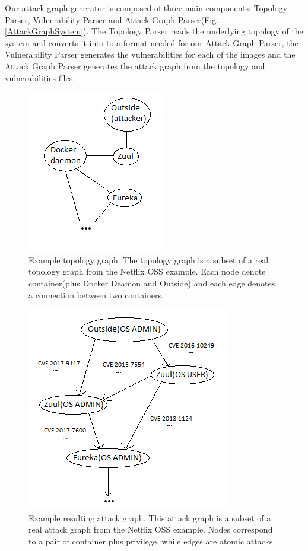 Our attack graph generator is composed of three main components: Topology Parser, Vulnerability Parser and Attack Graph Parser(Fig. \ref{AttackGraphSystem}). The Topology Parser reads the underlying topology of the system and converts it into to a format needed for our Attack Graph Parser, the Vulnerability Parser generates the vulnerabilities for each of the images and the Attack Graph Parser generates the attack graph from the topology and vulnerabilities files. 

\begin{figure}
	\includegraphics[]{./images/Topology_graph}
	\caption{Example topology graph. The topology graph is a subset of a real topology graph from the Netflix OSS example. Each node denote container(plus Docker Deamon and Outside) and each edge denotes a connection between two containers.}
	\label{TopologyGraph}
\end{figure}

\begin{figure}
	\includegraphics[]{./images/Attack_graph}
	\caption{Example resulting attack graph. This attack graph is a subset of a real attack graph from the Netflix OSS example. Nodes correspond to a pair of container plus privilege, while edges are atomic attacks.}
	\label{AttackGraph}
\end{figure}


